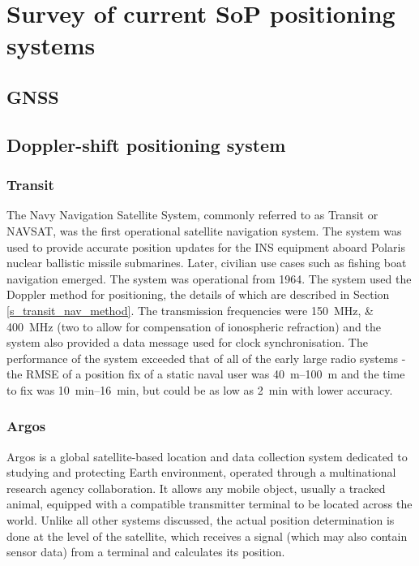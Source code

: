 \chapter{Survey of current SoP positioning systems}

\section{GNSS}

\section{Doppler-shift positioning system}
\subsection{Transit}
The Navy Navigation Satellite System, commonly referred to as Transit or NAVSAT, was the first operational satellite navigation system. The system was used to provide accurate position updates for the INS equipment aboard Polaris nuclear ballistic missile submarines. Later, civilian use cases such as fishing boat navigation emerged. The system was operational from 1964. The system used the Doppler method for positioning, the details of which are described in Section \ref{s_transit_nav_method}. The transmission frequencies were \qtylist{150;400}{MHz} (two to allow for compensation of ionospheric refraction) and the system also provided a data message used for clock synchronisation. The performance of the system exceeded that of all of the early large radio systems - the RMSE of a position fix of a static naval user was \qtyrange{40}{100}{m} and the time to fix was \qtyrange{10}{16}{min}, but could be as low as \qty{2}{min} with lower accuracy\cite{sat16}.

\subsection{Argos}
Argos is a global satellite-based location and data collection system dedicated to studying and protecting Earth environment, operated through a multinational research agency collaboration. It allows any mobile object, usually a tracked animal, equipped with a compatible transmitter terminal to be located across the world\cite{sat17}. Unlike all other systems discussed, the actual position determination is done at the level of the satellite, which receives a signal (which may also contain sensor data) from a terminal and calculates its position.

